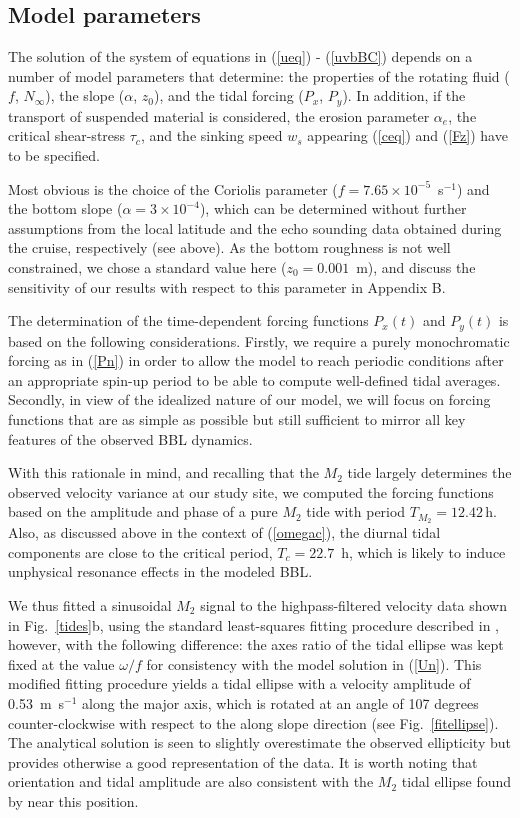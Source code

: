 \subsection{Model parameters}\label{parameters}

The solution of the system of equations in (\ref{ueq}) - (\ref{uvbBC})
depends on a number of model parameters that determine: the properties
of the rotating fluid ($f$, $N_\infty$), the slope ($\alpha$, $z_0$),
and the tidal forcing ($P_x$, $P_y$). In addition, if the transport of
suspended material is considered, the erosion parameter $\alpha_e$,
the critical shear-stress $\tau_c$, and the sinking speed $w_s$
appearing (\ref{ceq}) and (\ref{Fz}) have to be specified.

Most obvious is the choice of the Coriolis parameter ($f=7.65 \times
10^{-5}$~s$^{-1}$) and the bottom slope ($\alpha=3 \times 10^{-4}$),
which can be determined without further assumptions from the local
latitude and the echo sounding data obtained during the cruise,
respectively (see above). As the bottom roughness is not well
constrained, we chose a standard value here ($z_0=0.001$~m), and
discuss the sensitivity of our results with respect to this parameter
in Appendix B.

The determination of the time-dependent forcing functions $P_x(t)$ and
$P_y(t)$ is based on the following considerations. Firstly, we require
a purely monochromatic forcing as in (\ref{Pn}) in order to allow the
model to reach periodic conditions after an appropriate spin-up period
to be able to compute well-defined tidal averages. Secondly, in view
of the idealized nature of our model, we will focus on forcing
functions that are as simple as possible but still sufficient to
mirror all key features of the observed BBL dynamics.

With this rationale in mind, and recalling that the $M_2$ tide largely
determines the observed velocity variance at our study site, we
computed the forcing functions based on the amplitude and phase of a
pure $M_2$ tide with period $T_{M_2} = 12.42\,\text{h}$. Also, as
discussed above in the context of (\ref{omegac}), the diurnal tidal
components are close to the critical period, $T_c=22.7$~h, which is
likely to induce unphysical resonance effects in the modeled BBL.

We thus fitted a sinusoidal $M_2$ signal to the highpass-filtered
velocity data shown in Fig.\ \ref{tides}b, using the standard
least-squares fitting procedure described in \cite{EmeryThomson2001a},
however, with the following difference: the axes ratio of the tidal
ellipse was kept fixed at the value $\omega/f$ for consistency with
the model solution in (\ref{Un}). This modified fitting procedure
yields a tidal ellipse with a velocity amplitude of 0.53~m~s$^{-1}$
along the major axis, which is rotated at an angle of 107 degrees
counter-clockwise with respect to the along slope direction (see
Fig.\ \ref{fitellipse}). The analytical solution is seen to slightly
overestimate the observed ellipticity but provides otherwise a good
representation of the data.  It is worth noting that orientation and
tidal amplitude are also consistent with the $M_2$ tidal ellipse found
by \cite{Baoetal2000} near this position.

